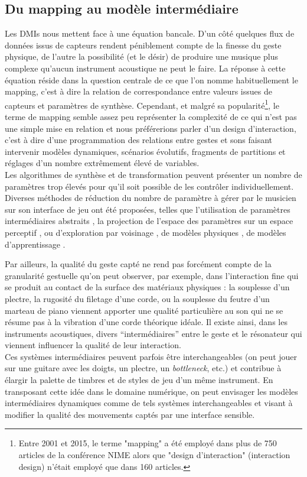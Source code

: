 \subsection{Du mapping au modèle intermédiaire}

\noindent Les \glspl{DMI} nous mettent face à une équation bancale. D'un côté quelques flux de données issus de capteurs rendent péniblement compte de la finesse du geste physique, de l'autre la possibilité (et le désir) de produire une musique plus complexe qu'aucun instrument acoustique ne peut le faire. La réponse à cette équation réside dans la question centrale de ce que l'on nomme habituellement le \gls{mapping}, c'est à dire la relation de correspondance entre valeurs issues de capteurs et paramètres de synthèse. Cependant, et malgré sa popularité\footnote{Entre 2001 et 2015, le terme "mapping" a été employé dans plus de 750 articles de la conférence \gls{NIME} alors que "design d'interaction" (interaction design) n'était employé que dans 160 articles.}, le terme de mapping semble assez peu représenter la complexité de ce qui n'est pas une simple mise en relation et nous préférerions parler d'un design d'interaction, c'est à dire d'une programmation des relations entre gestes et sons faisant intervenir modèles dynamiques, scénarios évolutifs, fragments de partitions et réglages d'un nombre extrêmement élevé de variables.\\
\indent Les algorithmes de synthèse et de transformation peuvent présenter un nombre de paramètres trop élevés pour qu'il soit possible de les contrôler individuellement. Diverses méthodes de réduction du nombre de paramètre à gérer par le musicien sur son interface de jeu ont été proposées, telles que l'utilisation de paramètres intermédiaires abstraits \cite{wanderley_escher-modeling_1998}, la projection de l'espace des paramètres sur un espace perceptif \cite{wessel_timbre_1979}, ou d'exploration par voisinage \cite{tubb_divergent_2014}, de modèles physiques \cite{todo}, de modèles d'apprentissage \cite{lee_real-time_1991, fiebrink_real-time_2011}.

\indent Par ailleurs, la qualité du geste capté ne rend pas forcément compte de la granularité gestuelle qu'on peut observer, par exemple, dans l'interaction fine qui se produit au contact de la surface des matériaux physiques : la souplesse d'un plectre, la rugosité du filetage d'une corde, ou la souplesse du feutre d'un marteau de piano viennent apporter une qualité particulière au son qui ne se résume pas à la vibration d'une corde théorique idéale. Il existe ainsi, dans les instruments acoustiques, divers ``intermédiaires'' entre le geste et le résonateur qui viennent influencer la qualité de leur interaction.\\
\indent Ces systèmes intermédiaires peuvent parfois être interchangeables (on peut jouer sur une guitare avec les doigts, un plectre, un \textit{bottleneck}, etc.) et contribue à élargir la palette de timbres et de styles de jeu d'un même instrument. En transposant cette idée dans le domaine numérique, on peut envisager les modèles intermédiaires dynamiques comme de tels systèmes interchangeables et visant à modifier la qualité des mouvements captés par une interface sensible.


